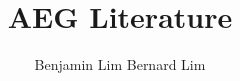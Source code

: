 \documentclass[11pt]{article}
\author{Benjamin Lim \qquad Bernard Lim}
\title{AEG Literature}
\begin{document}
\maketitle

\cite{AEG}



\end{document}
